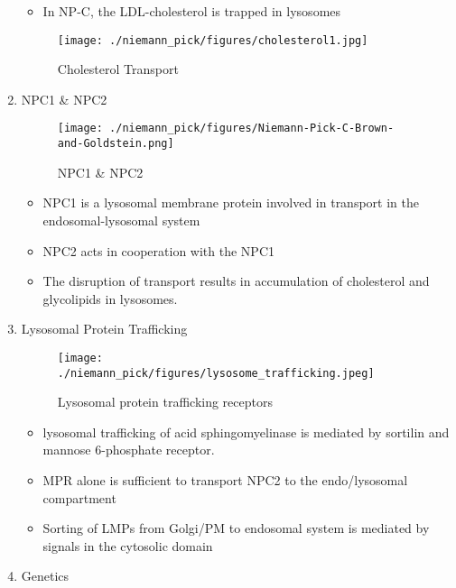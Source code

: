 \documentclass{scrartcl}
\begin{document}
\begin{enumerate}
\begin{itemize}
\item In NP-C, the LDL-cholesterol is trapped in lysosomes
\end{itemize}

\begin{figure}[htbp]
\centering
\texttt{[image: ./niemann\_pick/figures/cholesterol1.jpg]}
\caption{\label{fig:org5b9a4e3}
Cholesterol Transport}
\end{figure}


\item NPC1 \& NPC2
\label{sec:orgc4a2069}

\begin{figure}[htbp]
\centering
\texttt{[image: ./niemann\_pick/figures/Niemann-Pick-C-Brown-and-Goldstein.png]}
\caption{\label{fig:orged8e0ae}
NPC1 \& NPC2}
\end{figure}

\begin{itemize}
\item NPC1 is a lysosomal membrane protein involved in transport in the endosomal-lysosomal system
\item NPC2 acts in cooperation with the NPC1
\item The disruption of transport results in accumulation of cholesterol and glycolipids in lysosomes.
\end{itemize}

\item Lysosomal Protein Trafficking
\label{sec:org1564c73}

\begin{figure}[htbp]
\centering
\texttt{[image: ./niemann\_pick/figures/lysosome\_trafficking.jpeg]}
\caption{\label{fig:orge6b785a}
Lysosomal protein trafficking receptors}
\end{figure}

\begin{itemize}
\item lysosomal trafficking of acid sphingomyelinase is mediated by sortilin and mannose 6-phosphate receptor.
\item MPR alone is sufficient to transport NPC2 to the endo/lysosomal compartment
\item Sorting of LMPs from Golgi/PM to endosomal system is mediated by
signals in the cytosolic domain
\end{itemize}

\item Genetics
\label{sec:org3c1e764}


\end{enumerate}
\end{document}
